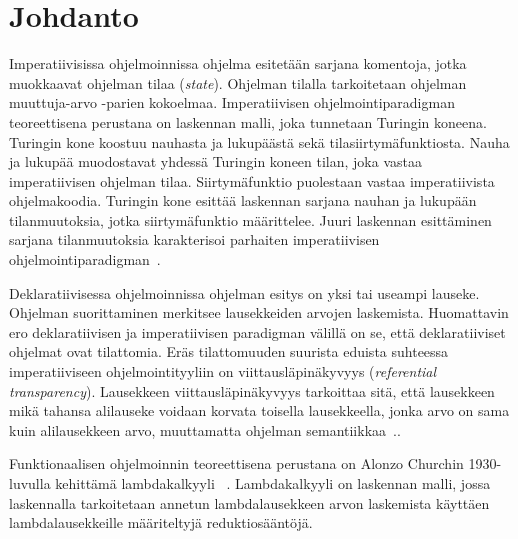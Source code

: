 \section{Johdanto}

Imperatiivisissa ohjelmoinnissa ohjelma esitetään sarjana komentoja, jotka muokkaavat ohjelman tilaa (\textit{state}). Ohjelman tilalla tarkoitetaan ohjelman muuttuja-arvo -parien kokoelmaa. Imperatiivisen ohjelmointiparadigman teoreettisena perustana on laskennan malli, joka tunnetaan Turingin koneena. Turingin kone koostuu nauhasta ja lukupäästä sekä tilasiirtymäfunktiosta. Nauha ja lukupää muodostavat yhdessä Turingin koneen tilan, joka vastaa imperatiivisen ohjelman tilaa. Siirtymäfunktio puolestaan vastaa imperatiivista ohjelmakoodia. Turingin kone esittää laskennan sarjana nauhan ja lukupään tilanmuutoksia, jotka siirtymäfunktio määrittelee. Juuri laskennan esittäminen sarjana tilanmuutoksia karakterisoi parhaiten imperatiivisen ohjelmointiparadigman~\cite[s.~3]{Hudak89}.
\par
Deklaratiivisessa ohjelmoinnissa ohjelman esitys on yksi tai useampi lauseke. Ohjelman suorittaminen merkitsee lausekkeiden arvojen laskemista. Huomattavin ero deklaratiivisen ja imperatiivisen paradigman välillä on se, että deklaratiiviset ohjelmat ovat tilattomia. Eräs tilattomuuden suurista eduista suhteessa imperatiiviseen ohjelmointityyliin on viittausläpinäkyvyys (\textit{referential transparency}). Lausekkeen viittausläpinäkyvyys tarkoittaa sitä, että lausekkeen mikä tahansa alilauseke voidaan korvata toisella lausekkeella, jonka arvo on sama kuin alilausekkeen arvo, muuttamatta ohjelman semantiikkaa~\cite[s.~5]{Hudak89}..  
\par
Funktionaalisen ohjelmoinnin teoreettisena perustana on Alonzo Churchin 1930-luvulla kehittämä lambdakalkyyli ~\cite[s.~37--50]{PJ1987}. Lambdakalkyyli on laskennan malli, jossa laskennalla tarkoitetaan annetun lambdalausekkeen arvon laskemista käyttäen lambdalausekkeille määriteltyjä reduktiosääntöjä.